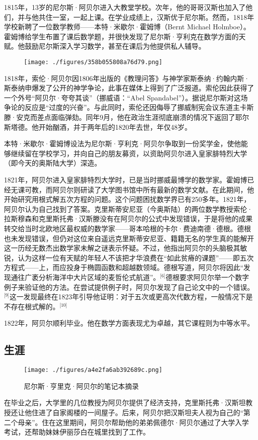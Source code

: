 1815年，13岁的尼尔斯·阿贝尔进入大教堂学校。次年，他的哥哥汉斯也加入了他们，并与他共住一室，一起上课。在学业成绩上，汉斯优于尼尔斯。然而，1818年学校新聘了一位数学教师——本特·米歇尔·霍姆博（Bernt Michael Holmboe）。霍姆博给学生布置了课后数学题，并很快发现了尼尔斯·亨利克在数学方面的天赋。他鼓励尼尔斯深入学习数学，甚至在课后为他提供私人辅导。
\begin{figure}[ht]
\centering
\texttt{[image: ./figures/358b055808a76d79.png]}
\caption{} \label{fig_NRSAB_1}
\end{figure}
1818年，索伦·阿贝尔因1806年出版的《教理问答》与神学家斯泰纳·约翰内斯·斯泰纳申爆发了公开的神学争论，此事在媒体上得到了广泛报道。索伦因此获得了一个外号“阿贝尔·夸夸其谈”（挪威语：“Abel Spandabel”）。据说尼尔斯对这场争论的反应是“过度的兴奋”。与此同时，索伦还因侮辱了挪威制宪会议东道主卡斯滕·安克而差点面临弹劾。同年9月，他在政治生涯彻底崩溃的情况下返回了耶尔斯塔德。他开始酗酒，并于两年后的1820年去世，年仅48岁。

本特·米歇尔·霍姆博设法为尼尔斯·亨利克·阿贝尔争取到一份奖学金，使他能够继续留在学校学习，并向自己的朋友募资，以资助阿贝尔进入皇家腓特烈大学（即今天的奥斯陆大学）深造。

1821年，阿贝尔进入皇家腓特烈大学时，已是当时挪威最博学的数学家。霍姆博已经无课可教，而阿贝尔则研读了大学图书馆中所有最新的数学文献。在此期间，他开始研究用根式解五次方程的问题。这个问题困扰数学界已有250多年。1821年，阿贝尔认为自己找到了答案。克里斯蒂安尼亚（今奥斯陆）的两位数学教授索伦·拉斯穆森和克里斯托弗·汉斯滕没有在阿贝尔的公式中发现错误，于是将他的成果转交给当时北欧地区最权威的数学家——哥本哈根的卡尔·费迪南德·德根。德根也未发现错误，但仍对这位来自遥远克里斯蒂安尼亚、籍籍无名的学生真的能解开这一历经无数杰出数学家未解之谜表示怀疑。不过，他指出阿贝尔的头脑极其敏锐，认为这样一位有天赋的年轻人不该把才华浪费在“如此贫瘠的课题”——即五次方程式——上，而应投身于椭圆函数和超越数领域。德根写道，阿贝尔将因此“发现通往广袤分析海洋中大片区域的麦哲伦式航道”。\(^\text{[6]}\)德根要求阿贝尔举一个数字例子来验证他的方法。在尝试提供例子时，阿贝尔发现了自己论文中的一个错误。\(^\text{[9]}\)这一发现最终在1823年引导他证明：对于五次或更高次代数方程，一般情况下是不存在根式解的。\(^\text{[10]}\)

1822年，阿贝尔顺利毕业。他在数学方面表现尤为卓越，其它课程则为中等水平。
\subsection{生涯}
\begin{figure}[ht]
\centering
\texttt{[image: ./figures/a4e2fa6ab392689c.png]}
\caption{尼尔斯·亨里克·阿贝尔的笔记本摘录} \label{fig_NRSAB_2}
\end{figure}
在毕业之后，大学里的几位教授为阿贝尔提供了经济支持，克里斯托弗·汉斯坦教授还让他住进了自家阁楼的一间屋子。后来，阿贝尔把汉斯坦夫人视为自己的“第二个母亲”。住在这里期间，阿贝尔帮助他的弟弟佩德尔·阿贝尔通过了大学入学考试，还帮助妹妹伊丽莎白在城里找到了工作。

